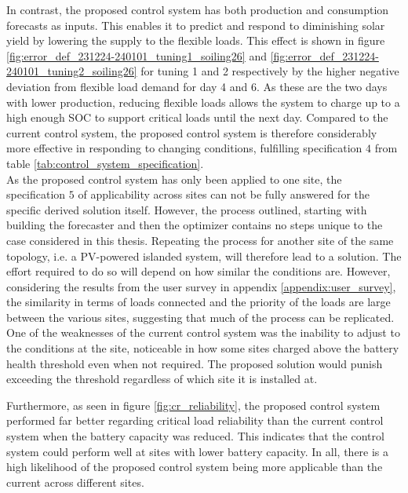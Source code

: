 In contrast, the proposed control system has both production and consumption forecasts as inputs. This enables it to predict and respond to diminishing solar yield by lowering the supply to the flexible loads. This effect is shown in figure \ref{fig:error_def_231224-240101_tuning1_soiling26} and \ref{fig:error_def_231224-240101_tuning2_soiling26} for tuning 1 and 2 respectively by the higher negative deviation from flexible load demand for day 4 and 6. As these are the two days with lower production, reducing flexible loads allows the system to charge up to a high enough SOC to support critical loads until the next day. Compared to the current control system, the proposed control system is therefore considerably more effective in responding to changing conditions, fulfilling specification $4$ from table \ref{tab:control_system_specification}.\\

As the proposed control system has only been applied to one site, the specification $5$ of applicability across sites can not be fully answered for the specific derived solution itself. However, the process outlined, starting with building the forecaster and then the optimizer contains no steps unique to the case considered in this thesis. Repeating the process for another site of the same topology, i.e. a PV-powered islanded system, will therefore lead to a solution. The effort required to do so will depend on how similar the conditions are. However, considering the results from the user survey in appendix \ref{appendix:user_survey}, the similarity in terms of loads connected and the priority of the loads are large between the various sites, suggesting that much of the process can be replicated. One of the weaknesses of the current control system was the inability to adjust to the conditions at the site, noticeable in how some sites charged above the battery health threshold even when not required. The proposed solution would punish exceeding the threshold regardless of which site it is installed at.

Furthermore, as seen in figure \ref{fig:cr_reliability}, the proposed control system performed far better regarding critical load reliability than the current control system when the battery capacity was reduced. This indicates that the control system could perform well at sites with lower battery capacity. In all, there is a high likelihood of the proposed control system being more applicable than the current across different sites.\\  

